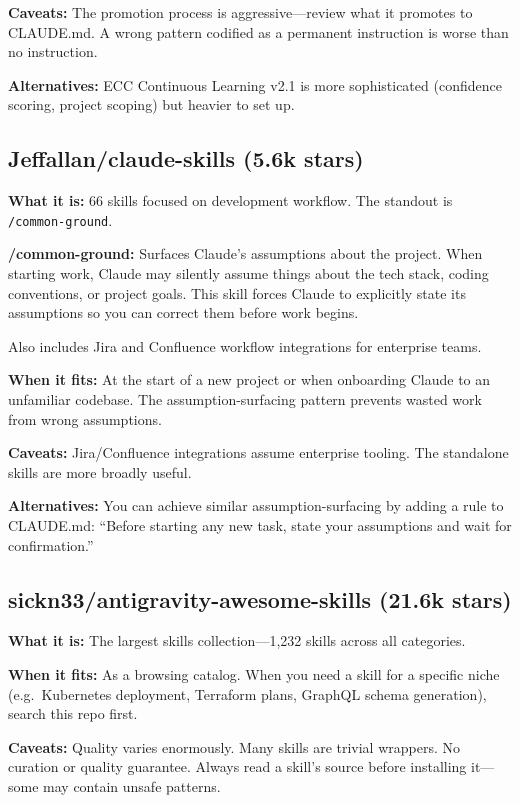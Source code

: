 \documentclass[11pt,a4paper]{article}
\begin{document}
\textbf{Caveats:} The promotion process is aggressive---review what it promotes to CLAUDE.md. A wrong pattern codified as a permanent instruction is worse than no instruction.

\textbf{Alternatives:} ECC Continuous Learning v2.1 is more sophisticated (confidence scoring, project scoping) but heavier to set up.

\subsection{Jeffallan/claude-skills (5.6k stars)}

\textbf{What it is:} 66 skills focused on development workflow. The standout is \texttt{/common-ground}.

\textbf{/common-ground:} Surfaces Claude's assumptions about the project. When starting work, Claude may silently assume things about the tech stack, coding conventions, or project goals. This skill forces Claude to explicitly state its assumptions so you can correct them before work begins.

Also includes Jira and Confluence workflow integrations for enterprise teams.

\textbf{When it fits:} At the start of a new project or when onboarding Claude to an unfamiliar codebase. The assumption-surfacing pattern prevents wasted work from wrong assumptions.

\textbf{Caveats:} Jira/Confluence integrations assume enterprise tooling. The standalone skills are more broadly useful.

\textbf{Alternatives:} You can achieve similar assumption-surfacing by adding a rule to CLAUDE.md: ``Before starting any new task, state your assumptions and wait for confirmation.''

\subsection{sickn33/antigravity-awesome-skills (21.6k stars)}

\textbf{What it is:} The largest skills collection---1,232 skills across all categories.

\textbf{When it fits:} As a browsing catalog. When you need a skill for a specific niche (e.g.\ Kubernetes deployment, Terraform plans, GraphQL schema generation), search this repo first.

\textbf{Caveats:} Quality varies enormously. Many skills are trivial wrappers. No curation or quality guarantee. Always read a skill's source before installing it---some may contain unsafe patterns.
\end{document}

